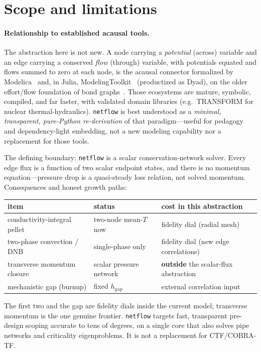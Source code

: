\documentclass[11pt]{article}
\begin{document}
\section{Scope and limitations}\label{sec:scope}
\paragraph{Relationship to established acausal tools.} The abstraction here is not
new. A node carrying a \emph{potential} (across) variable and an edge carrying a
conserved \emph{flow} (through) variable, with potentials equated and flows summed
to zero at each node, is the acausal connector formalized by
Modelica~\cite{modelica} and, in Julia, ModelingToolkit~\cite{mtk} (productized as
Dyad), on the older effort/flow foundation of bond graphs~\cite{bondgraph}. Those
ecosystems are mature, symbolic, compiled, and far faster, with validated domain
libraries (e.g.\ TRANSFORM for nuclear thermal-hydraulics). \texttt{netflow} is
best understood as a \emph{minimal, transparent, pure-Python re-derivation} of
that paradigm---useful for pedagogy and dependency-light embedding, not a new
modeling capability nor a replacement for those tools.

The defining boundary: \texttt{netflow} is a scalar conservation-network solver.
Every edge flux is a function of two scalar endpoint states, and there is no
momentum equation---pressure drop is a quasi-steady loss relation, not solved
momentum. Consequences and honest growth paths:
\begin{center}
\begin{tabular}{lll}
\toprule
item & status & cost in this abstraction \\
\midrule
conductivity-integral pellet & two-node mean-$T$ now & fidelity dial (radial mesh) \\
two-phase convection / DNB & single-phase only & fidelity dial (new edge correlations) \\
transverse momentum closure & scalar pressure network & \textbf{outside} the scalar-flux abstraction \\
mechanistic gap (burnup) & fixed $h_\text{gap}$ & external correlation input \\
\bottomrule
\end{tabular}
\end{center}
The first two and the gap are fidelity dials inside the current model; transverse
momentum is the one genuine frontier. \texttt{netflow} targets fast, transparent
pre-design scoping accurate to tens of degrees, on a single core that also solves
pipe networks and criticality eigenproblems. It is not a replacement for
CTF/COBRA-TF.
\end{document}
